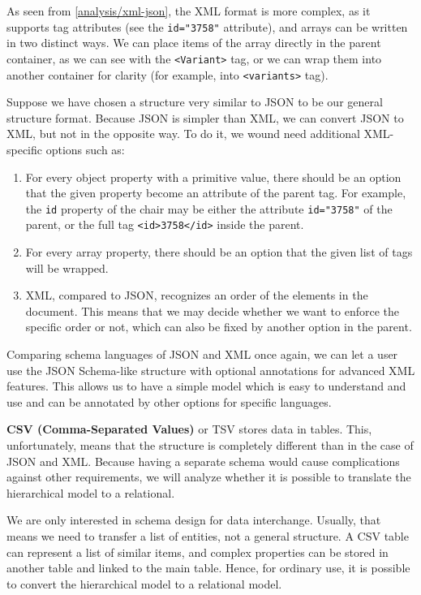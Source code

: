 As seen from \autoref{analysis/xml-json}, the XML format is more complex, as it supports tag attributes (see the \verb|id="3758"| attribute), and arrays can be written in two distinct ways. We can place items of the array directly in the parent container, as we can see with the \verb|<Variant>| tag, or we can wrap them into another container for clarity (for example, into \verb|<variants>| tag).

Suppose we have chosen a structure very similar to JSON to be our general structure format. Because JSON is simpler than XML, we can convert JSON to XML, but not in the opposite way. To do it, we wound need additional XML-specific options such as:
\begin{enumerate}
  \item For every object property with a primitive value, there should be an option that the given property become an attribute of the parent tag. For example, the \verb|id| property of the chair may be either the attribute \verb|id="3758"| of the parent, or the full tag \verb|<id>3758</id>| inside the parent.
  \item For every array property, there should be an option that the given list of tags will be wrapped.
  \item XML, compared to JSON, recognizes an order of the elements in the document. This means that we may decide whether we want to enforce the specific order or not, which can also be fixed by another option in the parent.
\end{enumerate}

Comparing schema languages of JSON and XML once again, we can let a user use the JSON Schema-like structure with optional annotations for advanced XML features. This allows us to have a simple model which is easy to understand and use and can be annotated by other options for specific languages.

\textbf{CSV (Comma-Separated Values)} or TSV stores data in tables. This, unfortunately, means that the structure is completely different than in the case of JSON and XML. Because having a separate schema would cause complications against other requirements, we will analyze whether it is possible to translate the hierarchical model to a relational.

We are only interested in schema design for data interchange. Usually, that means we need to transfer a list of entities, not a general structure. A CSV table can represent a list of similar items, and complex properties can be stored in another table and linked to the main table. Hence, for ordinary use, it is possible to convert the hierarchical model to a relational model. %

